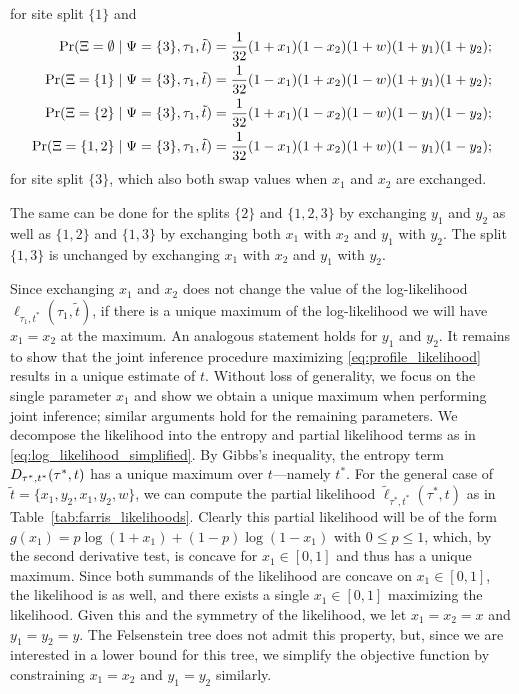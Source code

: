 for site split $\{1\}$ and
\begin{align*}
        \Pr(\Xi=\emptyset \mid \Psi=\{3\}, \tau_1, \tilde{t}) &= \frac{1}{32}(1+x_1)(1-x_2)(1+w)(1+y_1)(1+y_2); \\
    \Pr(\Xi=\{1\} \mid \Psi=\{3\}, \tau_1, \tilde{t}) &= \frac{1}{32}(1-x_1)(1+x_2)(1-w)(1+y_1)(1+y_2); \\
    \Pr(\Xi=\{2\} \mid \Psi=\{3\}, \tau_1, \tilde{t}) &= \frac{1}{32}(1+x_1)(1-x_2)(1-w)(1-y_1)(1-y_2); \\
    \Pr(\Xi=\{1,2\} \mid \Psi=\{3\}, \tau_1, \tilde{t}) &= \frac{1}{32}(1-x_1)(1+x_2)(1+w)(1-y_1)(1-y_2);
\end{align*}
for site split $\{3\}$, which also both swap values when $x_1$ and $x_2$ are exchanged.

The same can be done for the splits $\{2\}$ and $\{1,2,3\}$ by exchanging $y_1$ and $y_2$ as well as $\{1,2\}$ and $\{1,3\}$ by exchanging both $x_1$ with $x_2$ and $y_1$ with $y_2$.
The split $\{1,3\}$ is unchanged by exchanging $x_1$ with $x_2$ and $y_1$ with $y_2$.

Since exchanging $x_1$ and $x_2$ does not change the value of the log-likelihood $\ell_{\tau_1,t^*}(\tau_1, \tilde{t})$, if there is a unique maximum of the log-likelihood we will have $x_1=x_2$ at the maximum.
An analogous statement holds for $y_1$ and $y_2$.
It remains to show that the joint inference procedure maximizing \eqref{eq:profile_likelihood} results in a unique estimate of $t$.
Without loss of generality, we focus on the single parameter $x_1$ and show we obtain a unique maximum when performing joint inference; similar arguments hold for the remaining parameters.
We decompose the likelihood into the entropy and partial likelihood terms as in \eqref{eq:log_likelihood_simplified}.
By Gibbs's inequality, the entropy term $D_{\tau^*,t^*}(\tau^*,t)$ has a unique maximum over $t$---namely $t^*$.
For the general case of $\tilde{t}=\{x_1, y_2, x_1, y_2, w\}$, we can compute the partial likelihood $\tilde{\ell}_{\tau^*,t^*}(\tau^*, t)$ as in Table~\ref{tab:farris_likelihoods}.
Clearly this partial likelihood will be of the form $g(x_1) = p\log(1+x_1) + (1-p)\log(1-x_1)$ with $0 \le p \le 1$, which, by the second derivative test, is concave for $x_1\in[0,1]$ and thus has a unique maximum.
Since both summands of the likelihood are concave on $x_1\in[0,1]$, the likelihood is as well, and there exists a single $x_1\in[0,1]$ maximizing the likelihood.
Given this and the symmetry of the likelihood, we let $x_1=x_2=x$ and $y_1=y_2=y$.
The Felsenstein tree does not admit this property, but, since we are interested in a lower bound for this tree, we simplify the objective function by constraining $x_1=x_2$ and $y_1=y_2$ similarly.

